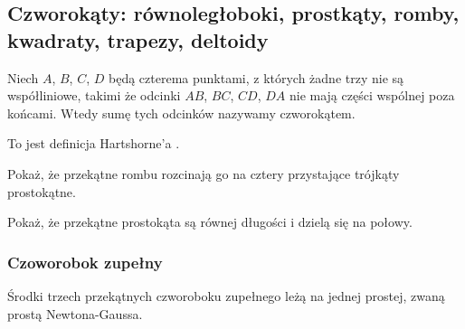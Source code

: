 %

\subsection{Czworokąty: równoległoboki, prostkąty, romby, kwadraty, trapezy, deltoidy}

\begin{definition}[czworokąt]
    Niech $A$, $B$, $C$, $D$ będą czterema punktami, z których żadne trzy nie są współliniowe, takimi że odcinki $AB$, $BC$, $CD$, $DA$ nie mają części wspólnej poza końcami.
    Wtedy sumę tych odcinków nazywamy czworokątem.
\end{definition}

To jest definicja Hartshorne'a \cite[s. 80]{hartshorne2000}.

Pokaż, że przekątne rombu rozcinają go na cztery przystające trójkąty prostokątne. %

Pokaż, że przekątne prostokąta są równej długości i dzielą się na połowy. %

\subsubsection{Czoworobok zupełny}


\begin{proposition}
	Środki trzech przekątnych czworoboku zupełnego leżą na jednej prostej, zwaną prostą Newtona-Gaussa.
\end{proposition}



%